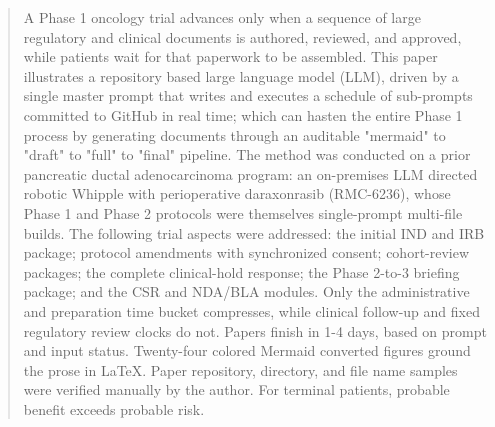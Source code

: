 \begin{abstract}
\noindent
A Phase 1 oncology trial advances only when a sequence of large regulatory and
clinical documents is authored, reviewed, and approved, while patients wait for that paperwork to be assembled. This paper illustrates a
repository based large language model (LLM), driven by a single master prompt that writes and executes a schedule of sub-prompts committed to GitHub in real time; which can hasten the entire
Phase 1 process by generating documents through an auditable
"mermaid" to "draft" to "full" to "final" pipeline. The method was conducted on a prior
pancreatic ductal adenocarcinoma program: an on-premises LLM directed
robotic Whipple with perioperative daraxonrasib (RMC-6236), whose Phase 1 and
Phase 2 protocols were themselves single-prompt multi-file builds. The following trial aspects were addressed: the initial IND and IRB package; protocol amendments with synchronized
consent; cohort-review packages; the complete clinical-hold response; the
Phase 2-to-3 briefing package; and the CSR and NDA/BLA modules. Only the administrative and preparation time bucket compresses, while
clinical follow-up and fixed regulatory review clocks do not. Papers finish in 1-4 days, based on prompt and input status. Twenty-four colored Mermaid converted figures ground the prose in
LaTeX. Paper repository, directory, and file name samples were verified manually by the author. For terminal patients, probable benefit exceeds probable risk.  
\end{abstract}

